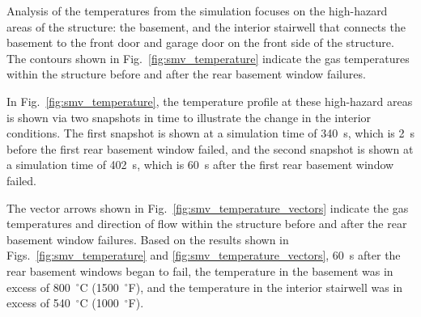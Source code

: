 \documentclass[12pt,oneside]{book}
\begin{document}
Analysis of the temperatures from the simulation focuses on the high-hazard areas of the structure: the basement, and the interior stairwell that connects the basement to the front door and garage door on the front side of the structure. The contours shown in Fig.~\ref{fig:smv_temperature} indicate the gas temperatures within the structure before and after the rear basement window failures.

In Fig.~\ref{fig:smv_temperature}, the temperature profile at these high-hazard areas is shown via two snapshots in time to illustrate the change in the interior conditions. The first snapshot is shown at a simulation time of 340~s, which is 2~s before the first rear basement window failed, and the second snapshot is shown at a simulation time of 402~s, which is 60~s after the first rear basement window failed.

The vector arrows shown in Fig.~\ref{fig:smv_temperature_vectors} indicate the gas temperatures and direction of flow within the structure before and after the rear basement window failures. Based on the results shown in Figs.~\ref{fig:smv_temperature} and \ref{fig:smv_temperature_vectors}, 60~s after the rear basement windows began to fail, the temperature in the basement was in excess of 800~$^{\circ}$C (1500~$^{\circ}$F), and the temperature in the interior stairwell was in excess of 540~$^{\circ}$C (1000~$^{\circ}$F).
\end{document}
